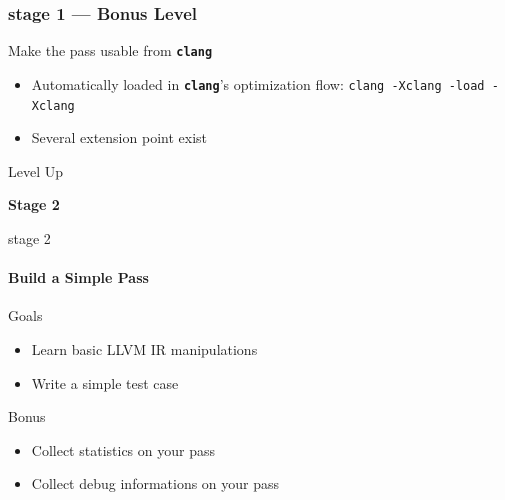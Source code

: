\documentclass[14pt]{beamer}
\newcommand{\Command}[1]{\textbf{\texttt{#1}}}
\begin{document}
    \begin{frame}[containsverbatim]
        \frametitle{stage 1 --- Bonus Level}
        \begin{alertblock}{Make the pass usable from \Command{clang}}
            \begin{itemize}
                \item Automatically loaded in \Command{clang}'s optimization flow: {\footnotesize\lstinline|clang -Xclang -load -Xclang|}
                \item Several extension point exist
            \end{itemize}
        \end{alertblock}

{
\scriptsize

}
    \end{frame}

    \begin{frame}{Level Up}
        \begin{center}
            \textbf{\Large Stage 2}
        \end{center}
    \end{frame}

    \begin{frame}{stage 2}

        \framesubtitle{Build a Simple Pass}

        \begin{block}{Goals}
            \begin{itemize}
                \item Learn basic LLVM IR manipulations
                \item Write a simple test case
            \end{itemize}

        \end{block}

        \begin{alertblock}{Bonus}
            \begin{itemize}
                \item Collect statistics on your pass
                \item Collect debug informations on your pass
            \end{itemize}
        \end{alertblock}

    \end{frame}
\end{document}
